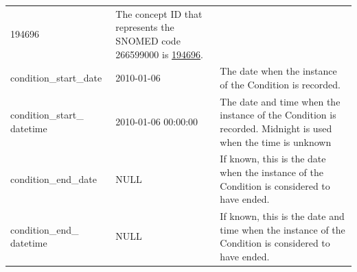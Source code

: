 \documentclass[11pt]{book}
\theoremstyle{definition}
\theoremstyle{definition}
\theoremstyle{definition}
\theoremstyle{remark}
\begin{document}
\begin{longtable}[]{@{}lll@{}}
\begin{minipage}[t]{0.15\columnwidth}
194696\strut
\end{minipage} & \begin{minipage}[t]{0.49\columnwidth}\raggedright
The concept ID that represents the SNOMED code 266599000 is \href{http://athena.ohdsi.org/search-terms/terms/194696}{194696}.\strut
\end{minipage}\tabularnewline
\begin{minipage}[t]{0.28\columnwidth}\raggedright
condition\_start\_date\strut
\end{minipage} & \begin{minipage}[t]{0.15\columnwidth}\raggedright
2010-01-06\strut
\end{minipage} & \begin{minipage}[t]{0.49\columnwidth}\raggedright
The date when the instance of the Condition is recorded.\strut
\end{minipage}\tabularnewline
\begin{minipage}[t]{0.28\columnwidth}\raggedright
condition\_start\_ datetime\strut
\end{minipage} & \begin{minipage}[t]{0.15\columnwidth}\raggedright
2010-01-06 00:00:00\strut
\end{minipage} & \begin{minipage}[t]{0.49\columnwidth}\raggedright
The date and time when the instance of the Condition is recorded. Midnight is used when the time is unknown\strut
\end{minipage}\tabularnewline
\begin{minipage}[t]{0.28\columnwidth}\raggedright
condition\_end\_date\strut
\end{minipage} & \begin{minipage}[t]{0.15\columnwidth}\raggedright
NULL\strut
\end{minipage} & \begin{minipage}[t]{0.49\columnwidth}\raggedright
If known, this is the date when the instance of the Condition is considered to have ended.\strut
\end{minipage}\tabularnewline
\begin{minipage}[t]{0.28\columnwidth}\raggedright
condition\_end\_ datetime\strut
\end{minipage} & \begin{minipage}[t]{0.15\columnwidth}\raggedright
NULL\strut
\end{minipage} & \begin{minipage}[t]{0.49\columnwidth}\raggedright
If known, this is the date and time when the instance of the Condition is considered to have ended.\strut

\end{minipage}
\end{longtable}
\end{document}
